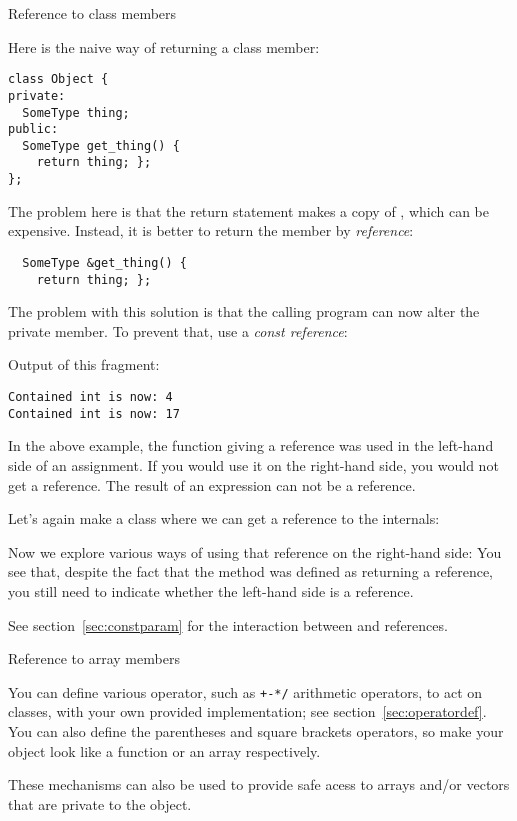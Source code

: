  {Reference to class members}
\label{sec:class-ref}

Here is the naive way of returning a class member:
\begin{verbatim}
class Object {
private:
  SomeType thing;
public:
  SomeType get_thing() {
    return thing; };
};
\end{verbatim}
The problem here is that the return statement makes a copy of
, which can be expensive. Instead, it is better to return the
member by \emph{reference}:
\begin{verbatim}
  SomeType &get_thing() { 
    return thing; };
\end{verbatim}
The problem with this solution is that the calling program can now
alter the private member. To prevent that, use a
\emph{const reference}:
%

Output of this fragment:
\begin{verbatim}
Contained int is now: 4
Contained int is now: 17
\end{verbatim}

In the above example, the function giving a reference was used in the left-hand side of
an assignment. If you would use it on the right-hand side, you would
not get a reference. The result of an expression can not be a
reference.

Let's again make a class where we can get a reference to the
internals:
%

Now we explore various ways of using that reference on the right-hand
side:
%
%
You see that, despite the fact that the method  was defined as
returning a reference, you still need to indicate whether the
left-hand side is a reference.

See section~\ref{sec:constparam} for the interaction between 
and references.

 {Reference to array members}
\label{sec:overloadbracket}

You can define various operator, such as \verb.+-*/. arithmetic
operators, to act on classes, with your own provided implementation;
see section~\ref{sec:operatordef}. You can also define the parentheses
and square brackets operators, so make your object look like a
function or an array respectively.

These mechanisms can also be used to provide safe acess to arrays
and/or vectors that are private to the object.

